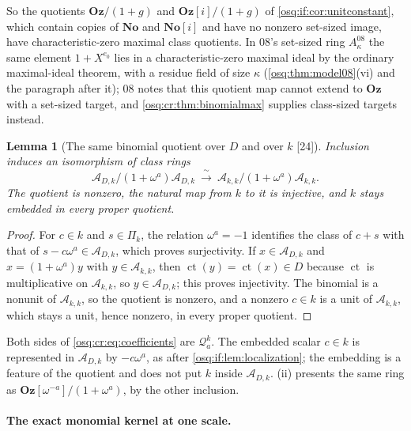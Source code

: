 \documentclass[11pt,letterpaper]{article}
\numberwithin{equation}{section}
\newtheorem{lemma}[lemma]{Lemma}
\theoremstyle{definition}
\theoremstyle{remark}
\theoremstyle{plain}
\newcommand{\No}{\mathbf{No}}
\newcommand{\Oz}{\mathbf{Oz}}
\newcommand{\SC}{\No[i]}
\newcommand{\GOz}{\Oz[i]}
\newcommand{\A}{\mathcal A}          %
\newcommand{\Qa}{\mathcal Q}         %
\newcommand{\ct}{\operatorname{ct}}
\newcommand{\src}[1]{\textup{\textsf{[#1]}}}
\begin{document}
So the quotients $\Oz/(1+g)$ and $\GOz/(1+g)$ of \cref{osq:if:cor:unitconstant}, which contain copies of $\No$ and $\SC$ and have no nonzero
set-sized image, have characteristic-zero maximal class quotients. In 08's set-sized ring $A^{08}_\kappa$ the same element $1+X^{e_0}$ lies in a
characteristic-zero maximal ideal by the ordinary maximal-ideal theorem, with a residue field of size $\kappa$ (\cref{osq:thm:model08}(vi) and the
paragraph after it); 08 notes that this quotient map cannot extend to $\Oz$ with a set-sized target, and \cref{osq:cr:thm:binomialmax} supplies class-sized
targets instead.

\begin{lemma}[The same binomial quotient over $D$ and over $k$ \src{24}]\label{osq:cr:lem:coefficients}
Inclusion induces an isomorphism of class rings
\begin{equation}\label{osq:cr:eq:coefficients}
 \A_{D,k}/(1+\omega^a)\A_{D,k}\ \xrightarrow{\ \sim\ }\ \A_{k,k}/(1+\omega^a)\A_{k,k}.
\end{equation}
The quotient is nonzero, the natural map from $k$ to it is injective, and $k$ stays embedded in every proper quotient.
\end{lemma}
\begin{proof}
For $c\in k$ and $s\in\Pi_k$, the relation $\omega^a=-1$ identifies the class of $c+s$ with that of $s-c\omega^a\in\A_{D,k}$, which proves
surjectivity. If $x\in\A_{D,k}$ and $x=(1+\omega^a)y$ with $y\in\A_{k,k}$, then $\ct(y)=\ct(x)\in D$ because $\ct$ is multiplicative on $\A_{k,k}$, so
$y\in\A_{D,k}$; this proves injectivity. The binomial is a nonunit of $\A_{k,k}$, so the quotient is nonzero, and a nonzero $c\in k$ is a unit of
$\A_{k,k}$, which stays a unit, hence nonzero, in every proper quotient.
\end{proof}

Both sides of \eqref{osq:cr:eq:coefficients} are $\Qa_a^k$. The embedded scalar $c\in k$ is represented in $\A_{D,k}$ by $-c\omega^a$, as after
\cref{osq:if:lem:localization}; the embedding is a feature of the quotient and does not put $k$ inside $\A_{D,k}$. (ii)
presents the same ring as $\Oz[\omega^{-a}]/(1+\omega^a)$, by the other inclusion.

\paragraph{The exact monomial kernel at one scale.}
\end{document}
